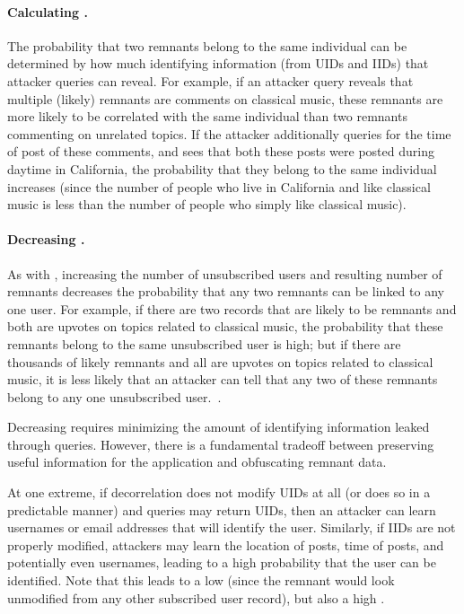 
\paragraph{Calculating \plinked{}.}
The probability that two remnants belong to the same individual can be determined by how much
identifying information (from UIDs and IIDs) that attacker queries can reveal.
For example, if an attacker query reveals that multiple
(likely) remnants are comments on classical music, these remnants are more likely to be
correlated with the same individual than two remnants commenting on unrelated topics. If the
attacker additionally queries for the time of post of these comments, and sees that both these posts
were posted during daytime in California, the probability that they belong to the same individual
increases (since the number of people who live in California and like classical music is less than
the number of people who simply like classical music).

\paragraph{Decreasing \plinked{}.}
As with \premnant{}, increasing the number of unsubscribed users and resulting
number of remnants decreases the probability that any two remnants can be linked to any one
user. For example, if there are two records that are likely to be remnants and both are upvotes on topics related to
classical music, the probability that these remnants belong to the same unsubscribed user is high; but if
there are thousands of likely remnants and all are upvotes on topics related to classical music, it
is less likely that an attacker can tell that any two of these remnants belong to any one
unsubscribed user.~.

Decreasing \plinked{} requires minimizing the amount of identifying information leaked
through queries. However, there is a fundamental tradeoff between preserving useful information for
the application and obfuscating remnant data. 

At one extreme, if decorrelation does not modify UIDs at all (or does so in a predictable manner)
and queries may return UIDs, then an attacker can learn usernames or email addresses that will
identify the user. Similarly, if IIDs are not properly modified, attackers may learn
the location of posts, time of posts, and potentially even usernames, leading to a high probability
that the user can be identified.  Note that this leads to a low \premnant{} (since the
remnant would look unmodified from any other subscribed user record), but also a high \plinked{}.


